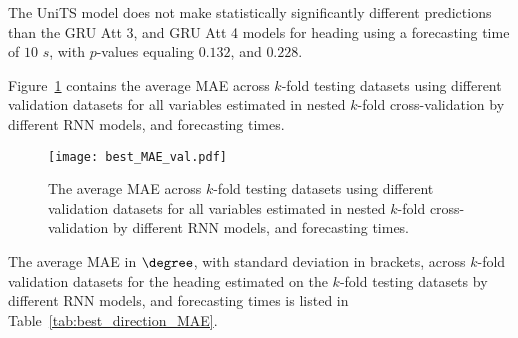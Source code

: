 The UniTS model does not make statistically significantly different predictions than the GRU Att 3, and GRU Att 4 models for heading using a forecasting time of $10$ $s$, with $p$-values equaling $0.132$, and $0.228$.

Figure~\ref{fig:best_MAE_val} contains the average MAE across $k$-fold testing datasets using different validation datasets for all variables estimated in nested $k$-fold cross-validation by different RNN models, and forecasting times.

\begin{figure}[!ht]
	\centering
	\texttt{[image: best\_MAE\_val.pdf]}
	\caption{The average MAE across $k$-fold testing datasets using different validation datasets for all variables estimated in nested $k$-fold cross-validation by different RNN models, and forecasting times.}
	\label{fig:best_MAE_val}
\end{figure}

The average MAE in $\degree$, with standard deviation in brackets, across $k$-fold validation datasets for the heading estimated on the $k$-fold testing datasets by different RNN models, and forecasting times is listed in Table~\ref{tab:best_direction_MAE}.

\begin{table}[!ht]
	\centering
	\caption{The average MAE in $\degree$, with standard deviation in brackets, across $k$-fold validation datasets for the heading estimated on the $k$-fold testing datasets by different RNN models, and forecasting times.}
	\label{tab:best_direction_MAE}
\end{table}


